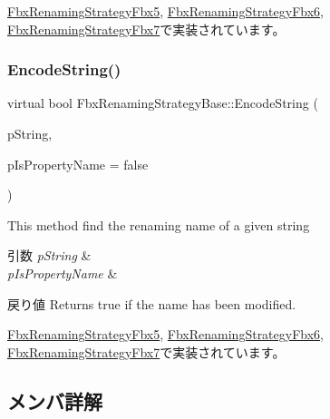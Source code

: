 \hyperlink{class_fbx_renaming_strategy_fbx5_a559a5b6e57b4ac39b09aaa13fa021ab9}{Fbx\+Renaming\+Strategy\+Fbx5}, \hyperlink{class_fbx_renaming_strategy_fbx6_a24a48914e694f5bada3b0604a4dc62bf}{Fbx\+Renaming\+Strategy\+Fbx6}, \hyperlink{class_fbx_renaming_strategy_fbx7_a9c3d4574319c2e744a80d66f6c7c0ae3}{Fbx\+Renaming\+Strategy\+Fbx7}で実装されています。

\mbox{\label{class_fbx_renaming_strategy_base_aa762726a9d92a328ec720f2b8135db09}} 
\subsubsection{\texorpdfstring{Encode\+String()}{EncodeString()}}
{\footnotesize\ttfamily virtual bool Fbx\+Renaming\+Strategy\+Base\+::\+Encode\+String (\begin{DoxyParamCaption}\item[{\hyperlink{class_fbx_name_handler}{Fbx\+Name\+Handler} \&}]{p\+String,  }\item[{bool}]{p\+Is\+Property\+Name = {\ttfamily false} }\end{DoxyParamCaption})\hspace{0.3cm}{\ttfamily [pure virtual]}}

This method find the renaming name of a given string 
\begin{DoxyParams}{引数}
{\em p\+String} & \\
\hline
{\em p\+Is\+Property\+Name} & \\
\hline
\end{DoxyParams}
\begin{DoxyReturn}{戻り値}
Returns true if the name has been modified. 
\end{DoxyReturn}


\hyperlink{class_fbx_renaming_strategy_fbx5_adcd74ccce2269d962b5bd8e8600c472c}{Fbx\+Renaming\+Strategy\+Fbx5}, \hyperlink{class_fbx_renaming_strategy_fbx6_aee897659c210920eefbcb899b8b463d6}{Fbx\+Renaming\+Strategy\+Fbx6}, \hyperlink{class_fbx_renaming_strategy_fbx7_ae7ce3bfd32c1cb7c8ac420972287760e}{Fbx\+Renaming\+Strategy\+Fbx7}で実装されています。



\subsection{メンバ詳解}
\mbox{\label{class_fbx_renaming_strategy_base_a9952264301fae41f0ecbc63bcaf1e7fa}} 
